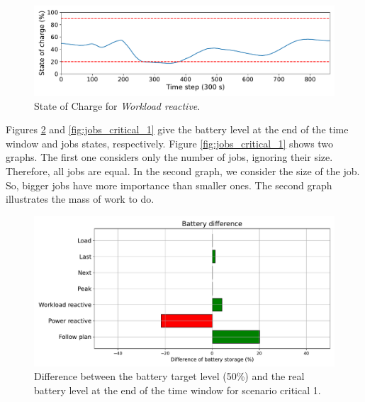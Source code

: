 \begin{figure}[!htb]
    \centering
    \includegraphics[scale=0.55]{Images/Compensations/critical_soc_s1.pdf}
    \caption{State of Charge for \emph{Workload reactive}.}
    \label{fig:DPM_soc}
\end{figure}

Figures \ref{fig:SoC_critical_1} and \ref{fig:jobs_critical_1} give the battery level at the end of the time window and jobs states, respectively. Figure \ref{fig:jobs_critical_1} shows two graphs. The first one considers only the number of jobs, ignoring their size. Therefore, all jobs are equal. In the second graph, we consider the size of the job. So, bigger jobs have more importance than smaller ones. The second graph illustrates the mass of work to do.

\begin{figure}[!htb]
    \centering
    \includegraphics[scale=0.55]{Images/Compensations/battery_critical_1.pdf}
    \caption{Difference between the battery target level (50\%) and the real battery level at the end of the time window for scenario critical 1.}
    \label{fig:SoC_critical_1}
\end{figure}

